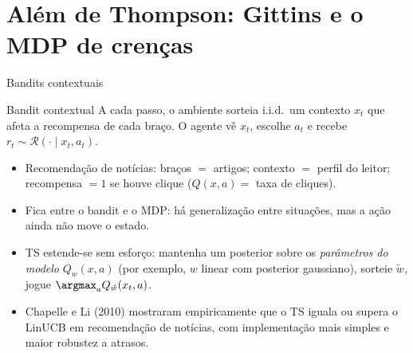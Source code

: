 \documentclass[aspectratio=169, 11pt]{beamer}
\begin{document}
\section{Além de Thompson: Gittins e o MDP de crenças}

\begin{frame}{Bandits contextuais}
  \begin{defbox}{Bandit contextual}
    A cada passo, o ambiente sorteia i.i.d.\ um \alert{contexto} $x_t$ que
    afeta a recompensa de cada braço. O agente vê $x_t$, escolhe $a_t$ e
    recebe $r_t \sim \mathcal{R}(\cdot \mid x_t, a_t)$.
  \end{defbox}

  \begin{itemize}
    \item Recomendação de notícias: braços $=$ artigos; contexto $=$
          perfil do leitor; recompensa $= 1$ se houve clique
          ($Q(x,a) = $ taxa de cliques).
    \item Fica entre o bandit e o MDP: há generalização entre situações,
          mas a ação ainda não move o estado.
    \item TS estende-se sem esforço: mantenha um posterior sobre os
          \emph{parâmetros do modelo} $Q_w(x,a)$ (por exemplo, $w$ linear
          com posterior gaussiano), sorteie $\tilde{w}$, jogue
          $\argmax_a Q_{\tilde{w}}(x_t,a)$.
    \item Chapelle e Li (2010) mostraram empiricamente que o TS iguala ou
          supera o LinUCB em recomendação de notícias, com implementação
          mais simples e maior robustez a atrasos.
  \end{itemize}
\end{frame}
\end{document}
